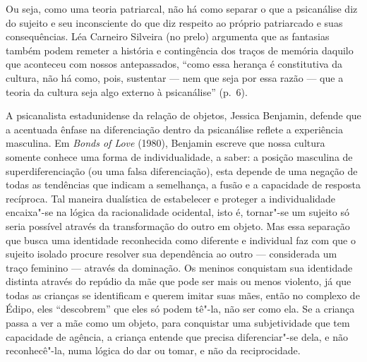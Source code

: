 Ou seja, como uma teoria patriarcal, não há como separar o que a
psicanálise diz do sujeito e seu inconsciente do que diz respeito ao
próprio patriarcado e suas consequências. Léa Carneiro Silveira (no
prelo) argumenta que as fantasias também podem remeter a história e
contingência dos traços de memória daquilo que aconteceu com nossos
antepassados, ``como essa herança é constitutiva da cultura, não há como,
pois, sustentar --- nem que seja por essa razão --- que a teoria da
cultura seja algo externo à psicanálise'' (p.~6).

A psicanalista estadunidense da relação de objetos, Jessica Benjamin,
defende que a acentuada ênfase na diferenciação dentro da psicanálise
reflete a experiência masculina. Em \emph{Bonds of Love} (1980),
Benjamin escreve que nossa cultura somente conhece uma forma de
individualidade, a saber: a posição masculina de superdiferenciação (ou
uma falsa diferenciação), esta depende de uma negação de todas as
tendências que indicam a semelhança, a fusão e a capacidade de resposta
recíproca. Tal maneira dualística de estabelecer e proteger a
individualidade encaixa"-se na lógica da racionalidade ocidental, isto é,
tornar"-se um sujeito só seria possível através da transformação do outro
em objeto. Mas essa separação que busca uma identidade reconhecida como
diferente e individual faz com que o sujeito isolado procure resolver
sua dependência ao outro --- considerada um traço feminino --- através
da dominação. Os meninos conquistam sua identidade distinta através do
repúdio da mãe que pode ser mais ou menos violento, já que todas as
crianças se identificam e querem imitar suas mães, então no complexo de
Édipo, eles ``descobrem'' que eles só podem tê"-la, não ser como ela. Se
a criança passa a ver a mãe como um objeto, para conquistar uma
subjetividade que tem capacidade de agência, a criança entende que
precisa diferenciar"-se dela, e não reconhecê"-la, numa lógica do dar ou
tomar, e não da reciprocidade.

